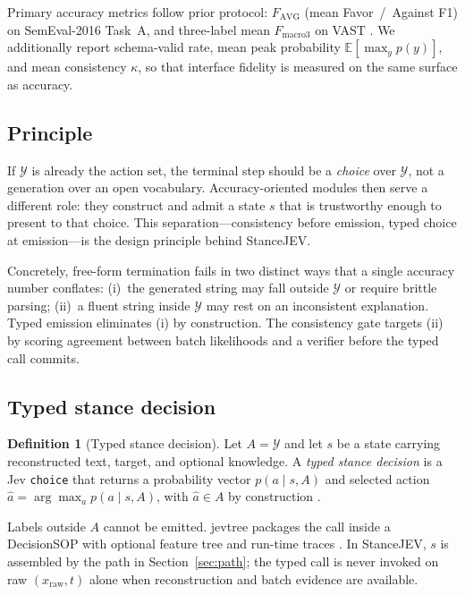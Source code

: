\documentclass[10pt]{article}
\theoremstyle{definition}
\newtheorem{definition}{Definition}
\begin{document}
Primary accuracy metrics follow prior protocol: $F_{\mathrm{AVG}}$ (mean Favor~/~Against F1) on
SemEval-2016 Task~A, and three-label mean $F_{\mathrm{macro3}}$ on VAST
\cite{mohammad2016semeval,allaway2020vast,yan2025cover}.
We additionally report schema-valid rate, mean peak probability $\mathbb{E}[\max_y p(y)]$, and mean
consistency $\kappa$, so that interface fidelity is measured on the same surface as accuracy.

\subsection{Principle}
\label{sec:principle}
If $\mathcal{Y}$ is already the action set, the terminal step should be a \emph{choice} over $\mathcal{Y}$,
not a generation over an open vocabulary.
Accuracy-oriented modules then serve a different role: they construct and admit a state $s$ that is
trustworthy enough to present to that choice.
This separation---consistency before emission, typed choice at emission---is the design principle behind
StanceJEV.

Concretely, free-form termination fails in two distinct ways that a single accuracy number conflates:
(i)~the generated string may fall outside $\mathcal{Y}$ or require brittle parsing;
(ii)~a fluent string inside $\mathcal{Y}$ may rest on an inconsistent explanation.
Typed emission eliminates (i) by construction.
The consistency gate targets (ii) by scoring agreement between batch likelihoods and a verifier before the
typed call commits.

\subsection{Typed stance decision}
\begin{definition}[Typed stance decision]
\label{def:typedstance}
Let $A=\mathcal{Y}$ and let $s$ be a state carrying reconstructed text, target, and optional knowledge.
A \emph{typed stance decision} is a Jev \texttt{choice} that returns a probability vector
$p(a\mid s,A)$ and selected action $\hat{a}=\arg\max_a p(a\mid s,A)$, with $\hat{a}\in A$ by construction
\cite{typesafe2026jev,openrouter2026jev}.
\end{definition}
Labels outside $A$ cannot be emitted.
jevtree packages the call inside a DecisionSOP with optional feature tree and run-time traces
\cite{jevtree2026}.
In StanceJEV, $s$ is assembled by the path in Section~\ref{sec:path}; the typed call is never invoked on raw
$(x_{\mathrm{raw}},t)$ alone when reconstruction and batch evidence are available.
\end{document}
